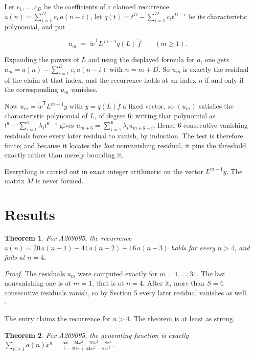 \documentclass[11pt]{article}
\newtheorem{theorem}{Theorem}
\theoremstyle{definition}
\begin{document}
Let $c_1,\dots,c_D$ be the coefficients of a claimed recurrence $a(n) = \sum_{i=1}^{D} c_i\,a(n-i)$, let $q(t) = t^{D} - \sum_{i=1}^{D} c_i t^{D-i}$ be its characteristic polynomial, and put

\[u_m \;=\; \tilde w^{\mathsf T} L^{\,m-1} q(L)\,\tilde f \qquad (m \ge 1).\]

Expanding the powers of $L$ and using the displayed formula for $a$, one gets $u_m = a(n) - \sum_{i=1}^{D} c_i\,a(n-i)$ with $n = m + D$. So $u_m$ is exactly the residual of the claim at that index, and the recurrence holds at an index $n$ if and only if the corresponding $u_m$ vanishes.

Now $u_m = \tilde w^{\mathsf T} L^{m-1} y$ with $y = q(L)\tilde f$ a fixed vector, so $(u_m)$ satisfies the characteristic polynomial of $L$, of degree $6$: writing that polynomial as $t^{6} - \sum_{i=1}^{6} \lambda_i t^{6-i}$ gives $u_{m+6} = \sum_{i=1}^{6} \lambda_i u_{m+6-i}$. Hence $6$ consecutive vanishing residuals force every later residual to vanish, by induction. The test is therefore finite; and because it locates the {\itshape last} nonvanishing residual, it pins the threshold exactly rather than merely bounding it.

Everything is carried out in exact integer arithmetic on the vector $L^{m-1}y$. The matrix $M$ is never formed.

\section{Results}

\begin{theorem} For A209095, the recurrence $a(n) = 20\,a(n-1) - 44\,a(n-2) + 16\,a(n-3)$ holds for every $n > 4$, and fails at $n = 4$.\end{theorem}

{\itshape Proof.} The residuals $u_m$ were computed exactly for $m = 1,\dots,31$. The last nonvanishing one is at $m = 1$, that is at $n = 4$. After it, more than $S = 6$ consecutive residuals vanish, so by Section 5 every later residual vanishes as well. $\square$

The entry claims the recurrence for $n > 4$. The theorem is at least as strong.

\begin{theorem} For A209095, the generating function is exactly $\sum_{n\ge 1} a(n)x^n = \frac{5x - 24x^{2} + 26x^{3} - 8x^{4}}{1 - 20x + 44x^{2} - 16x^{3}}$.\end{theorem}
\end{document}
